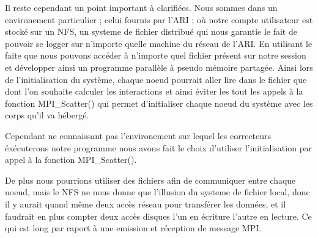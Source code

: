 \par Il reste cependant un point important à clarifiées. Nous sommes dans un environement particulier ; 
celui fournis par l'ARI ; où notre compte utilisateur est stocké sur un NFS, un systeme de fichier 
distribué qui nous garantie le fait de pouvoir se logger sur n'importe quelle machine du réseau 
de l'ARI. En utilisant le faite que nous pouvons accéder à n'importe quel fichier présent sur 
notre session et développer ainsi un programme parallèle à pseudo mémoire partagée.
Ainsi lors de l'initialisation du système, chaque noeud  pourrait aller lire dans le fichier 
que dont l'on souhaite calculer les interactions et ainsi éviter les tout les appels à la fonction 
MPI\_Scatter() qui permet d'initialiser chaque noeud du système avec les corps qu'il va hébergé.\\

\par Cependant ne connaissant pas l'environement sur lequel les correcteurs éxécuterons notre 
programme nous avons fait le choix d'utiliser l'initialisation par appel à la fonction MPI\_Scatter().\\

\par De plus nous pourrions utiliser des fichiers afin de communiquer entre chaque noeud, mais le NFS ne nous
donne que l'illusion du systeme de fichier local, donc il y aurait quand même deux accès réseau pour 
transférer les données, et il faudrait en plus compter deux accès disques l'un en écriture l'autre en lecture.
Ce qui est long par raport à une emission et réception de message MPI.\\
